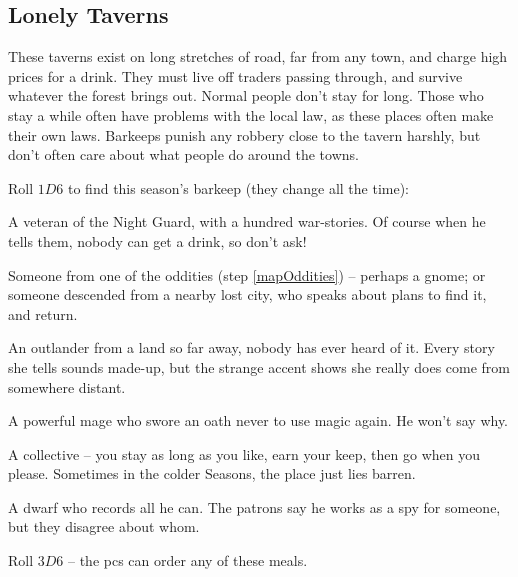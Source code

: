 \begin{multicols}{2}

\subsection{Lonely Taverns}
\label{lonelyTaverns}

These taverns exist on long stretches of road, far from any town, and
charge high prices for a drink. They must live off traders passing
through, and survive whatever the forest brings out. Normal people don't
stay for long. Those who stay a while often have problems with the local
law, as these places often make their own laws. Barkeeps punish any
robbery close to the tavern harshly, but don't often care about what
people do around the towns.


Roll $1D6$ to find this season's barkeep (they change all the time):

\begin{dlist}
  \item
  A veteran of the Night Guard, with a hundred war-stories. Of course
  when he tells them, nobody can get a drink, so don't ask!
  \item
  Someone from one of the oddities (step \ref{mapOddities}) -- perhaps a gnome; or someone descended from a nearby lost city, who speaks about plans to find it, and return.
  \item
  An outlander from a land so far away, nobody has ever heard of it.
  Every story she tells sounds made-up, but the strange accent shows she really does come from somewhere distant.
  \item
  A powerful mage who swore an oath never to use magic again.
  He won't say why.
  \item
  A collective -- you stay as long as you like, earn your keep, then go
  when you please. Sometimes in the colder Seasons, the place just lies
  barren.
  \item
  A dwarf who records all he can.
  The patrons say he works as a spy for someone, but they disagree about whom.
\end{dlist}


Roll $3D6$ -- the \glspl{pc} can order any of these meals.

\newcommand\menuItem[3][(\arabic{r12} \glspl{cp})]{%
  \randomdozen%
  \randomthree%
  \randomfourB%
  \ifodd\value{enumi}
    \randomthreeC%
    \randomfour%
  \fi
  \item
  \textbf{#2:}
  #3
  #1
}


\end{multicols}
